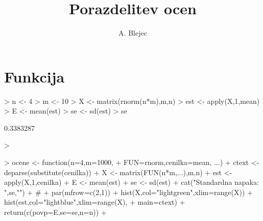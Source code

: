 \documentclass[a4paper,12pt]{article}
\begin{document}
\title{Porazdelitev ocen}
\author{A. Blejec}
%

\maketitle
\tableofcontents

\section{Funkcija}

\begin{Schunk}
\begin{Sinput}
> n <- 4
> m <- 10
> X <- matrix(rnorm(n*m),m,n)
> est <- apply(X,1,mean)
> E <- mean(est)
> se <- sd(est)
> se
\end{Sinput}
\begin{Soutput}
[1] 0.3383287
\end{Soutput}
\begin{Sinput}
> 
\end{Sinput}
\end{Schunk}

\begin{Schunk}
\begin{Sinput}
> ocene <- function(n=4,m=1000, 
+ FUN=rnorm,cenilka=mean, ...){
+ ctext <- deparse(substitute(cenilka))
+ X <- matrix(FUN(n*m,...),m,n)
+ est <- apply(X,1,cenilka)
+ E <- mean(est)
+ se <- sd(est)
+ cat("Standardna napaka: \n",se,"\n")
+ #
+ par(mfrow=c(2,1))
+ hist(X,col="lightgreen",xlim=range(X))
+ hist(est,col="lightblue",xlim=range(X),
+ main=ctext)
+ return(c(povp=E,se=se,n=n))
+ }
\end{Sinput}
\end{Schunk}
\end{document}
